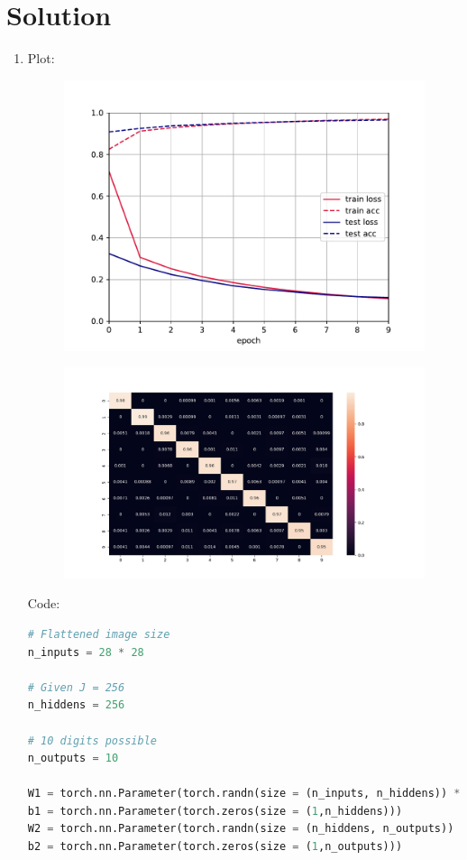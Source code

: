 \documentclass[submit]{../harvardml}
\newenvironment{answer}
  {\section*{Solution}}
{}
\begin{document}
\begin{answer}

  \begin{enumerate}
    \item[1.]

      Plot: 
      \begin{figure}[H]
          \centering
          \includegraphics[width=0.8\linewidth]{hw3/final_plot.pdf}
      \end{figure}
      \begin{figure}[H]
          \centering
          \includegraphics[width=0.9\linewidth]{hw3/confusion_matrix.png}
      \end{figure}

      Code:

      \begin{lstlisting}[language=Python]
# Flattened image size 
n_inputs = 28 * 28

# Given J = 256
n_hiddens = 256

# 10 digits possible
n_outputs = 10

W1 = torch.nn.Parameter(torch.randn(size = (n_inputs, n_hiddens)) * 0.01)
b1 = torch.nn.Parameter(torch.zeros(size = (1,n_hiddens)))
W2 = torch.nn.Parameter(torch.randn(size = (n_hiddens, n_outputs)) * 0.01)
b2 = torch.nn.Parameter(torch.zeros(size = (1,n_outputs)))


\end{lstlisting}
\end{enumerate}
\end{answer}
\end{document}
